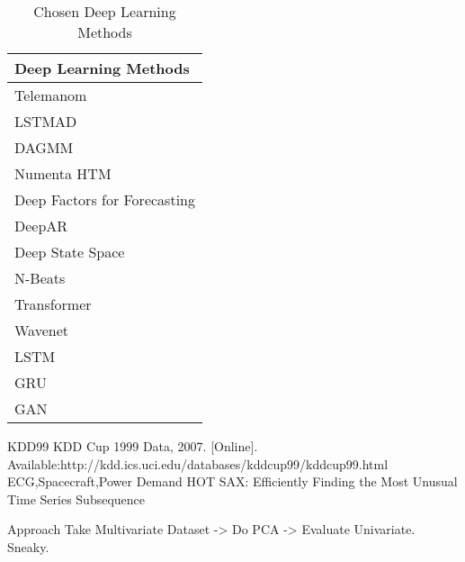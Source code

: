 \begin{table}[h]\centering
        \begin{tabular}{l}
            Deep Learning Methods                                                     \\\midrule                                                                               
            Telemanom                                                                 \\\addlinespace
            LSTMAD                                                                    \\\addlinespace
            DAGMM                                                                     \\\addlinespace
            Numenta HTM                                                               \\\addlinespace
            Deep Factors for Forecasting                                              \\\addlinespace
            DeepAR                                                                    \\\addlinespace
            Deep State Space                                                          \\\addlinespace
            N-Beats                                                                   \\\addlinespace
            Transformer                                                               \\\addlinespace
            Wavenet                                                                   \\\addlinespace
            LSTM                                                                      \\\addlinespace
            GRU                                                                       \\\addlinespace
            GAN                                                                       \\
        \end{tabular}
    \caption{Chosen Deep Learning Methods}\label{tab:chosen-packages}
\end{table}




KDD99 KDD Cup 1999 Data, 2007. [Online]. Available:http://kdd.ics.uci.edu/databases/kddcup99/kddcup99.html
ECG,Spacecraft,Power Demand HOT SAX: Efficiently Finding the Most Unusual Time Series Subsequence

Approach Take Multivariate Dataset -> Do PCA -> Evaluate Univariate. Sneaky.

